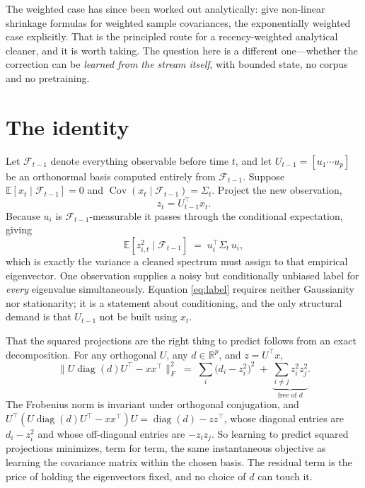 \documentclass[11pt]{article}
\newcommand{\Fp}{\mathcal F_{t-1}}
\newcommand{\Ee}{\mathbb E}
\begin{document}
The weighted case has since been worked out analytically: \citet{oriol2024weighted} give non-linear
shrinkage formulas for weighted sample covariances, the exponentially weighted case explicitly. That
is the principled route for a recency-weighted analytical cleaner, and it is worth taking. The
question here is a different one---whether the correction can be \emph{learned from the stream
itself}, with bounded state, no corpus and no pretraining.

\section{The identity}

Let $\Fp$ denote everything observable before time $t$, and let $U_{t-1} = [u_1 \cdots u_p]$ be an
orthonormal basis computed entirely from $\Fp$. Suppose $\Ee[x_t \mid \Fp] = 0$ and
$\operatorname{Cov}(x_t \mid \Fp) = \Sigma_t$. Project the new observation,
\[
  z_t = U_{t-1}^\top x_t .
\]
Because $u_i$ is $\Fp$-measurable it passes through the conditional expectation, giving
\begin{equation}\label{eq:label}
  \Ee\!\left[z_{i,t}^2 \mid \Fp\right] \;=\; u_i^\top \Sigma_t\, u_i ,
\end{equation}
which is exactly the variance a cleaned spectrum must assign to that empirical eigenvector. One
observation supplies a noisy but conditionally unbiased label for \emph{every} eigenvalue
simultaneously. Equation \eqref{eq:label} requires neither Gaussianity nor stationarity; it is a
statement about conditioning, and the only structural demand is that $U_{t-1}$ not be built using
$x_t$.

That the squared projections are the right thing to predict follows from an exact decomposition. For
any orthogonal $U$, any $d \in \mathbb R^p$, and $z = U^\top x$,
\begin{equation}\label{eq:frob}
  \bigl\| U \operatorname{diag}(d) U^\top - x x^\top \bigr\|_F^2
   \;=\; \sum_i \bigl(d_i - z_i^2\bigr)^2 \;+\; \underbrace{\sum_{i \neq j} z_i^2 z_j^2}_{\text{free of } d} .
\end{equation}
The Frobenius norm is invariant under orthogonal conjugation, and
$U^\top ( U \operatorname{diag}(d) U^\top - xx^\top ) U = \operatorname{diag}(d) - z z^\top$, whose
diagonal entries are $d_i - z_i^2$ and whose off-diagonal entries are $-z_i z_j$. So learning to
predict squared projections minimizes, term for term, the same instantaneous objective as learning
the covariance matrix within the chosen basis. The residual term is the price of holding the
eigenvectors fixed, and no choice of $d$ can touch it.
\end{document}
